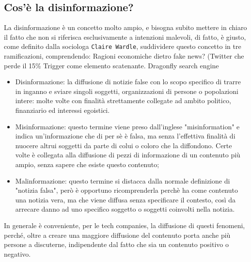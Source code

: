 \documentclass{article}
\begin{document}
\centering\subsection{Cos'è la disinformazione?}
\begin{justify}
    La disinformazione è un concetto molto ampio, e bisogna subito mettere in chiaro il fatto che non si riferisca esclusivamente a intenzioni malevoli, di fatto, è giusto, come definito dalla sociologa \texttt{Claire Wardle}, suddividere questo concetto in tre ramificazioni, comprendendo: Ragioni economiche dietro fake news? (Twitter che perde il 15\%  Trigger come elemento scatenante.
    Dragonfly search engine
\begin{itemize}
    \item Disinformazione: la diffusione di notizie false con lo scopo specifico di trarre in inganno e sviare singoli soggetti, organizzazioni di persone o popolazioni intere: molte volte con finalità strettamente collegate ad ambito politico, finanziario ed interessi egoistici.
    \item Misinformazione: questo termine viene preso dall'inglese "misinformation" e indica un'informazione che di per sè è falsa, ma senza l'effettiva finalità di nuocere altrui soggetti da parte di colui o coloro che la diffondono. Certe volte è collegata alla diffusione di pezzi di informazione di un contenuto più ampio, senza sapere che esiste questo contenuto;
    \item Malinformazione: questo termine si distacca dalla normale definizione di "notizia falsa", però è opportuno ricomprenderla perchè ha come contenuto una notizia vera, ma che viene diffusa senza specificare il contesto, così da arrecare danno ad uno specifico soggetto o soggetti coinvolti nella notizia. \citep{wardle2018information}
\end{itemize}
In generale è conveniente, per le tech companies, la diffusione di questi fenomeni, perché, oltre a creare una maggiore diffusione del contenuto porta anche più persone a discuterne, indipendente dal fatto che sia un contenuto positivo o negativo.
\end{justify}
\end{document}
